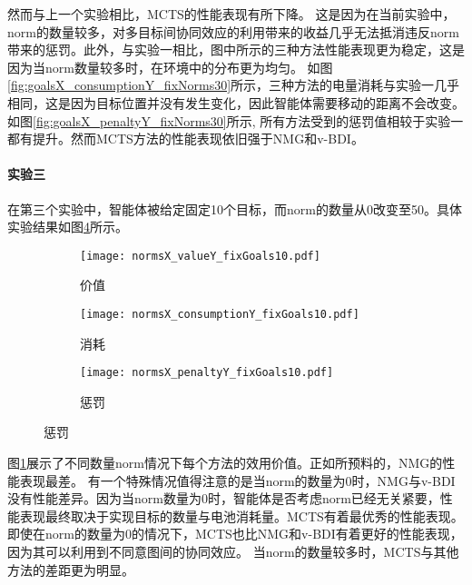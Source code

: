 然而与上一个实验相比，MCTS的性能表现有所下降。
这是因为在当前实验中，norm的数量较多，对多目标间协同效应的利用带来的收益几乎无法抵消违反norm带来的惩罚。此外，与实验一相比，图中所示的三种方法性能表现更为稳定，这是因为当norm数量较多时，在环境中的分布更为均匀。
如图\ref{fig:goalsX_consumptionY_fixNorms30}所示，三种方法的电量消耗与实验一几乎相同，这是因为目标位置并没有发生变化，因此智能体需要移动的距离不会改变。
如图\ref{fig:goalsX_penaltyY_fixNorms30}所示, 所有方法受到的惩罚值相较于实验一都有提升。然而MCTS方法的性能表现依旧强于NMG和v-BDI。

\paragraph{实验三}
在第三个实验中，智能体被给定固定10个目标，而norm的数量从0改变至50。具体实验结果如图\ref{fig:all_fixGoals10}所示。

\begin{figure}
\centering
\begin{subfigure}{.47\textwidth}
\centering
\texttt{[image: normsX\_valueY\_fixGoals10.pdf]}
\captionsetup{justification=centering}
\caption{价值}
\label{fig:normsX_valueY_fixGoals10}
\end{subfigure}

\begin{subfigure}{.47\textwidth}
  \centering
  \texttt{[image: normsX\_consumptionY\_fixGoals10.pdf]}
  \captionsetup{justification=centering}
  \caption{消耗}
  \label{fig:normsX_consumptionY_fixGoals10}
\end{subfigure}
\begin{subfigure}{.47\textwidth}
  \centering
  \texttt{[image: normsX\_penaltyY\_fixGoals10.pdf]}
  \captionsetup{justification=centering}
  \caption{惩罚}
  \label{fig:normsX_penaltyY_fixGoals10}
\end{subfigure}
\captionsetup{justification=centering}
\label{fig:all_fixGoals10}
\end{figure}
图\ref{fig:normsX_valueY_fixGoals10}展示了不同数量norm情况下每个方法的效用价值。正如所预料的，NMG的性能表现最差。
有一个特殊情况值得注意的是当norm的数量为0时，NMG与v-BDI没有性能差异。因为当norm数量为0时，智能体是否考虑norm已经无关紧要，性能表现最终取决于实现目标的数量与电池消耗量。MCTS有着最优秀的性能表现。即使在norm的数量为0的情况下，MCTS也比NMG和v-BDI有着更好的性能表现，因为其可以利用到不同意图间的协同效应。
当norm的数量较多时，MCTS与其他方法的差距更为明显。


